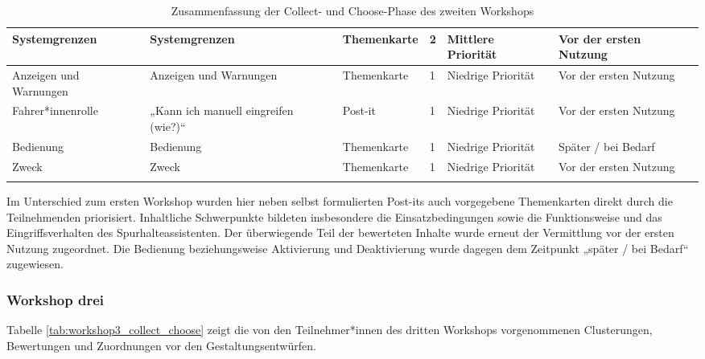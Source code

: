 {\begin{xltabular}{\textwidth}{
    |P{2.5cm}
    |Y
    |P{1.4cm}
    |P{1.2cm}
    |P{2.0cm}
    |P{2.4cm}|
}
Systemgrenzen &
Systemgrenzen &
Themenkarte &
2 &
Mittlere Priorität &
Vor der ersten Nutzung
\\
\hline

Anzeigen und Warnungen &
Anzeigen und Warnungen &
Themenkarte &
1 &
Niedrige Priorität &
Vor der ersten Nutzung
\\
\hline

Fahrer*innenrolle &
„Kann ich manuell eingreifen (wie?)“ &
Post-it &
1 &
Niedrige Priorität &
Vor der ersten Nutzung
\\
\hline

Bedienung &
Bedienung &
Themenkarte &
1 &
Niedrige Priorität &
Später / bei Bedarf
\\
\hline

Zweck &
Zweck &
Themenkarte &
1 &
Niedrige Priorität &
Vor der ersten Nutzung
\\
\hline

\caption{Zusammenfassung der Collect- und Choose-Phase des zweiten Workshops}
\label{tab:workshop2_collect_choose}
\\

\end{xltabular}
}

Im Unterschied zum ersten Workshop wurden hier neben selbst formulierten Post-its auch vorgegebene Themenkarten direkt durch die Teilnehmenden priorisiert. Inhaltliche Schwerpunkte bildeten insbesondere die Einsatzbedingungen sowie die Funktionsweise und das Eingriffsverhalten des Spurhalteassistenten. Der überwiegende Teil der bewerteten Inhalte wurde erneut der Vermittlung vor der ersten Nutzung zugeordnet. Die Bedienung beziehungsweise Aktivierung und Deaktivierung wurde dagegen dem Zeitpunkt „später / bei Bedarf“ zugewiesen.

\subsubsection{Workshop drei}
\label{subsubsec:Ergebnisse_Workshop_drei}

Tabelle \ref{tab:workshop3_collect_choose} zeigt die von den Teilnehmer*innen des dritten Workshops vorgenommenen Clusterungen, Bewertungen und Zuordnungen vor den Gestaltungsentwürfen.

